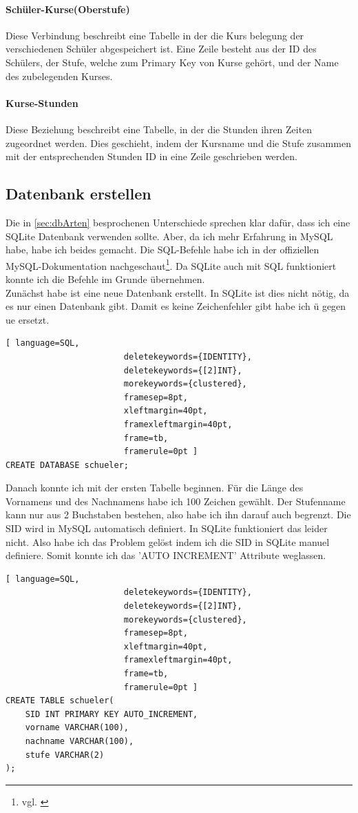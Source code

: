 \documentclass[a4paper, 12pt]{article}
\theoremstyle{plain}
\theoremstyle{definition}
\begin{document}
\paragraph{Schüler-Kurse(Oberstufe)}
Diese Verbindung beschreibt eine Tabelle in der die Kurs belegung der verschiedenen Schüler abgespeichert ist. Eine Zeile besteht aus der ID des Schülers, der Stufe, welche zum Primary Key von Kurse  gehört, und der Name des zubelegenden Kurses.
\paragraph{Kurse-Stunden}
Diese Beziehung beschreibt eine Tabelle, in der die Stunden ihren Zeiten zugeordnet werden. Dies geschieht, indem der Kursname und die Stufe zusammen mit der entsprechenden Stunden ID in eine Zeile geschrieben werden.

	\subsection{Datenbank erstellen}
	\label{sec:dbErst}
	Die in \ref{sec:dbArten} besprochenen Unterschiede sprechen klar dafür, dass ich eine SQLite Datenbank verwenden sollte. Aber, da ich mehr Erfahrung in MySQL habe, habe ich beides gemacht. Die SQL-Befehle habe ich in der offiziellen MySQL-Dokumentation nachgeschaut\footnote{vgl. \cite{sqlDocu}}. Da SQLite auch mit SQL funktioniert konnte ich die Befehle im Grunde übernehmen. \\ 

Zunächst habe ist eine neue Datenbank erstellt. In SQLite ist dies nicht nötig, da es nur einen Datenbank gibt. Damit es keine Zeichenfehler gibt habe ich ü gegen ue ersetzt.
	\begin{lstlisting}[ language=SQL,
	                    deletekeywords={IDENTITY},
	                    deletekeywords={[2]INT},
	                    morekeywords={clustered},
	                    framesep=8pt,
	                    xleftmargin=40pt,
	                    framexleftmargin=40pt,
	                    frame=tb,
	                    framerule=0pt ]
CREATE DATABASE schueler;\end{lstlisting}
Danach konnte ich mit der ersten Tabelle beginnen. Für die Länge des Vornamens und des Nachnamens habe ich 100 Zeichen gewählt. Der Stufenname kann nur aus 2 Buchstaben bestehen, also habe ich ihn darauf auch begrenzt. Die SID wird in MySQL automatisch definiert. In SQLite funktioniert das leider nicht. Also habe ich das Problem gelöst indem ich die SID in SQLite manuel definiere. Somit konnte ich das 'AUTO INCREMENT' Attribute weglassen.
	\begin{lstlisting}[ language=SQL,
	                    deletekeywords={IDENTITY},
	                    deletekeywords={[2]INT},
	                    morekeywords={clustered},
	                    framesep=8pt,
	                    xleftmargin=40pt,
	                    framexleftmargin=40pt,
	                    frame=tb,
	                    framerule=0pt ]
CREATE TABLE schueler(
	SID INT PRIMARY KEY AUTO_INCREMENT, 
	vorname VARCHAR(100), 
	nachname VARCHAR(100), 
	stufe VARCHAR(2)
);\end{lstlisting}
\end{document}

